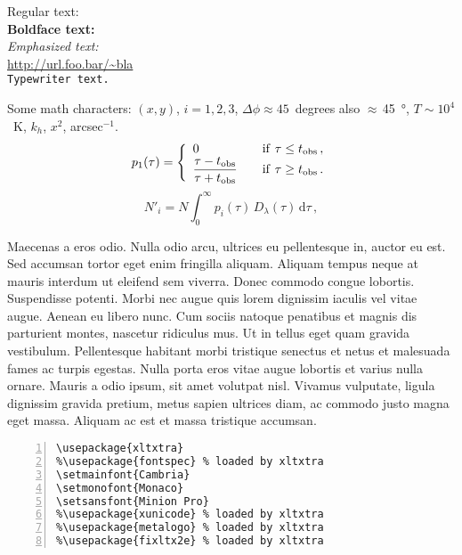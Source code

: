 Regular text: \ \\
\textbf{Boldface text: \ }\\
\emph{Emphasized text: \ }\\
\url{http://url.foo.bar/~bla}\\
\texttt{Typewriter text.}

Some math characters: $(x,y)$, $i=1,2,3$, $\Delta\phi\approx45$~degrees also $\approx$\,\SI{45}{\degree}, $T\sim10^4$~K, $k_h$, $x^2$, arcsec$^{-1}$.
\begin{equation}
	p_1(\tau)=\left\{\begin{array}{ll}
		\displaystyle0&\kern1em \mathrm{if}~\tau\le t_\mathrm{obs}\,,\\
		\displaystyle\frac{\tau-t_\mathrm{obs}}{\tau+t_\mathrm{obs}}&
			\kern1em \mathrm{if}~\tau\ge t_\mathrm{obs}\,.
		\end{array}\right.
\end{equation}
\begin{equation}
	N'_i=
		N\int_0^\infty\!\!p_i(\tau)\,
		D_\lambda(\tau)\,\mathrm{d}\tau\,,
\end{equation}

Maecenas a eros odio. Nulla odio arcu, ultrices eu pellentesque in, auctor eu est. Sed accumsan tortor eget enim fringilla aliquam. Aliquam tempus neque at mauris interdum ut eleifend sem viverra. Donec commodo congue lobortis. Suspendisse potenti. Morbi nec augue quis lorem dignissim iaculis vel vitae augue. Aenean eu libero nunc. Cum sociis natoque penatibus et magnis dis parturient montes, nascetur ridiculus mus. Ut in tellus eget quam gravida vestibulum. Pellentesque habitant morbi tristique senectus et netus et malesuada fames ac turpis egestas. Nulla porta eros vitae augue lobortis et varius nulla ornare. Mauris a odio ipsum, sit amet volutpat nisl. Vivamus vulputate, ligula dignissim gravida pretium, metus sapien ultrices diam, ac commodo justo magna eget massa. Aliquam ac est et massa tristique accumsan. 

\begin{Verbatim}[numbers=left, framerule=1pt]
% see http://www.ctan.org/tex-archive/macros/xetex/latex/xltxtra/xltxtra.pdf
\usepackage{xltxtra} 
%\usepackage{fontspec} % loaded by xltxtra
\setmainfont{Cambria}
\setmonofont{Monaco}
\setsansfont{Minion Pro}
%\usepackage{xunicode} % loaded by xltxtra
%\usepackage{metalogo} % loaded by xltxtra
%\usepackage{fixltx2e} % loaded by xltxtra
\end{Verbatim}

